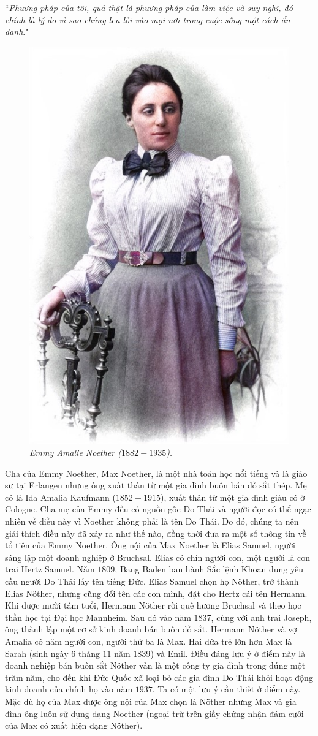 \vspace*{160pt}

	``\textit{Phương pháp của tôi, quả thật là phương pháp của làm việc và suy nghĩ, 
	đó chính là lý do vì sao chúng len lỏi vào mọi nơi trong cuộc sống một cách ẩn danh}."
\begin{multicols}{2}
		\begin{figure}[H]
		\centering
		\captionsetup{labelformat= empty, justification=centering}
		\includegraphics[width= 0.45\linewidth]{1a}
		\caption{\small\textit{\color{lichsutoanhoc}Emmy Amalie Noether ($1882-1935$).}}
		\vspace*{-10pt}
	\end{figure}
	Cha của Emmy Noether, Max Noether, là một nhà toán học nổi tiếng và là giáo sư tại Erlangen nhưng ông xuất thân từ một gia đình buôn bán đồ sắt thép. Mẹ cô là Ida Amalia Kaufmann ($1852-1915$), xuất thân từ một gia đình giàu có ở Cologne. Cha mẹ của Emmy đều có nguồn gốc Do Thái và người đọc có thể ngạc nhiên về điều này vì Noether không phải là tên Do Thái. Do đó, chúng ta nên giải thích điều này đã xảy ra như thế nào, đồng thời đưa ra một số thông tin về tổ tiên của Emmy Noether. Ông nội của Max Noether là Elias Samuel, người sáng lập một doanh nghiệp ở Bruchsal. Elias có chín người con, một người là con trai Hertz Samuel. Năm $1809$, Bang Baden ban hành Sắc lệnh Khoan dung yêu cầu người Do Thái lấy tên tiếng Đức. Elias Samuel chọn họ Nöther, trở thành Elias Nöther, nhưng cũng đổi tên các con mình, đặt cho Hertz cái tên Hermann. Khi được mười tám tuổi, Hermann Nöther rời quê hương Bruchsal và theo học thần học tại Đại học Mannheim. Sau đó vào năm $1837$, cùng với anh trai Joseph, ông thành lập một cơ sở kinh doanh bán buôn đồ sắt. Hermann Nöther và vợ Amalia có năm người con, người thứ ba là Max. Hai đứa trẻ lớn hơn Max là Sarah (sinh ngày $6$ tháng $11$ năm $1839$) và Emil. Điều đáng lưu ý ở điểm này là doanh nghiệp bán buôn sắt Nöther vẫn là một công ty gia đình trong đúng một trăm năm, cho đến khi Đức Quốc xã loại bỏ các gia đình Do Thái khỏi hoạt động kinh doanh của chính họ vào năm $1937$. Ta có một lưu ý cần thiết ở điểm này. Mặc dù họ của Max được ông nội của Max chọn là Nöther nhưng Max và gia đình ông  luôn sử dụng dạng Noether (ngoại trừ trên giấy chứng nhận đám cưới của Max có xuất hiện dạng Nöther).

\end{multicols}
